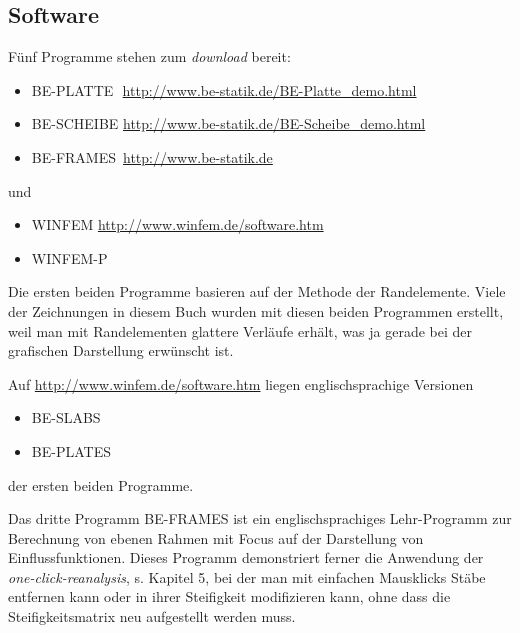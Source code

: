 \textcolor{chapterTitleBlue}{\chapter{Software}}

F\"{u}nf Programme stehen zum {\em download\/} bereit:\\

\begin{itemize}\label{SoftwareDownload}
  \item BE-PLATTE \qquad \,\,\href{http://www.be-statik.de/BE-Platte\_demo.html}{http://www.be-statik.de/BE-Platte\_demo.html} 
  \item BE-SCHEIBE \qquad \href{http://www.be-statik.de/BE-Scheibe\_demo.html}{http://www.be-statik.de/BE-Scheibe\_demo.html} 
  \item BE-FRAMES \qquad \,\href{http://www.be-statik.de}{http://www.be-statik.de}
\end{itemize}
und
\begin{itemize}
  \item WINFEM   \qquad \qquad \!\!\href{http://www.winfem.de/software.htm}{http://www.winfem.de/software.htm}
  \item WINFEM-P
\end{itemize}
Die ersten beiden Programme basieren auf der Methode der Randelemente. Viele der Zeichnungen in diesem Buch wurden mit diesen beiden Programmen erstellt, weil man mit Randelementen glattere Verl\"{a}ufe erh\"{a}lt, was ja gerade bei der grafischen Darstellung erw\"{u}nscht ist.

Auf \href{http://www.winfem.de/software.htm}{http://www.winfem.de/software.htm} liegen englischsprachige Versionen
\begin{itemize}
  \item BE-SLABS
  \item BE-PLATES
\end{itemize}
 der ersten beiden Programme.

Das dritte Programm BE-FRAMES ist ein englischsprachiges Lehr-Pro\-gramm zur Berechnung von ebenen Rahmen mit Focus auf der Darstellung von Einflussfunktionen. Dieses Programm demonstriert ferner die Anwendung der {\em one-click-reanalysis\/}, s. Kapitel 5, bei der man mit einfachen Mausklicks St\"{a}be entfernen kann oder in ihrer Steifigkeit modifizieren kann, ohne dass die Steifigkeitsmatrix neu aufgestellt werden muss.\\

